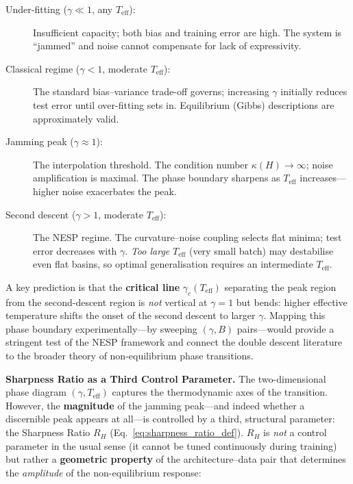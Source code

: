 \documentclass[
  journal=largetwo,
  simfonts=false,
  year=2025,
  volume=37,
]{cup-journal}
\begin{document}
\begin{description}
    \item[Under-fitting ($\gamma \ll 1$, any $T_{\mathrm{eff}}$):] Insufficient capacity; both bias and training error are high. The system is ``jammed'' and noise cannot compensate for lack of expressivity.
    
    \item[Classical regime ($\gamma < 1$, moderate $T_{\mathrm{eff}}$):] The standard bias--variance trade-off governs; increasing $\gamma$ initially reduces test error until over-fitting sets in. Equilibrium (Gibbs) descriptions are approximately valid.
    
    \item[Jamming peak ($\gamma \approx 1$):] The interpolation threshold. The condition number $\kappa(H) \to \infty$; noise amplification is maximal. The phase boundary sharpens as $T_{\mathrm{eff}}$ increases---higher noise exacerbates the peak.
    
    \item[Second descent ($\gamma > 1$, moderate $T_{\mathrm{eff}}$):] The NESP regime. The curvature--noise coupling selects flat minima; test error decreases with $\gamma$. \emph{Too large} $T_{\mathrm{eff}}$ (very small batch) may destabilise even flat basins, so optimal generalisation requires an intermediate $T_{\mathrm{eff}}$.
\end{description}

\noindent A key prediction is that the \textbf{critical line} $\gamma_c(T_{\mathrm{eff}})$ separating the peak region from the second-descent region is \emph{not} vertical at $\gamma = 1$ but bends: higher effective temperature shifts the onset of the second descent to larger $\gamma$. Mapping this phase boundary experimentally---by sweeping $(\gamma, B)$ pairs---would provide a stringent test of the NESP framework and connect the double descent literature to the broader theory of non-equilibrium phase transitions.

\medskip
\noindent\textbf{Sharpness Ratio as a Third Control Parameter.}
The two-dimensional phase diagram $(\gamma, T_{\mathrm{eff}})$ captures the thermodynamic axes of the transition. However, the \textbf{magnitude} of the jamming peak---and indeed whether a discernible peak appears at all---is controlled by a third, structural parameter: the Sharpness Ratio $R_H$ (Eq.~\ref{eq:sharpness_ratio_def}). $R_H$ is \emph{not} a control parameter in the usual sense (it cannot be tuned continuously during training) but rather a \textbf{geometric property} of the architecture--data pair that determines the \textit{amplitude} of the non-equilibrium response:
\end{document}
